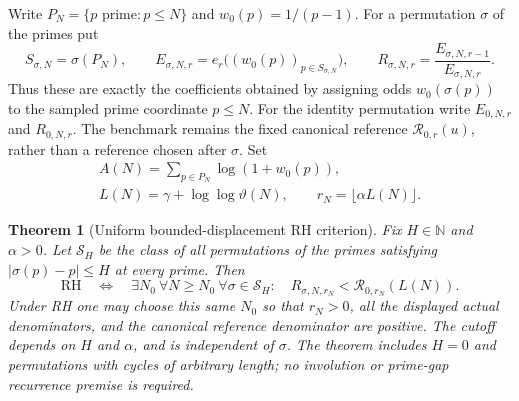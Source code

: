 \documentclass[11pt]{article}
\newtheorem{theorem}{Theorem}[section]
\theoremstyle{definition}
\begin{document}
Write $P_N=\{p\text{ prime}:p\le N\}$ and $w_0(p)=1/(p-1)$.
For a permutation $\sigma$ of the primes put
\[
 S_{\sigma,N}=\sigma(P_N),\qquad
 E_{\sigma,N,r}=e_r\bigl((w_0(p))_{p\in S_{\sigma,N}}\bigr),\qquad
 R_{\sigma,N,r}=\frac{E_{\sigma,N,r-1}}{E_{\sigma,N,r}}.
\]
Thus these are exactly the coefficients obtained by assigning odds
$w_0(\sigma(p))$ to the sampled prime coordinate $p\le N$.
For the identity permutation write $E_{0,N,r}$ and $R_{0,N,r}$.
The benchmark remains the fixed canonical reference
$\mathcal R_{0,r}(u)$, rather than a reference chosen after $\sigma$.
Set
\[
 \begin{gathered}
 A(N)=\sum_{p\in P_N}\log(1+w_0(p)),\\
 L(N)=\gamma+\log\log\vartheta(N),\qquad
 r_N=\lfloor\alpha L(N)\rfloor .
 \end{gathered}
\]

\begin{theorem}[Uniform bounded-displacement RH criterion]
Fix $H\in\mathbb N$ and $\alpha>0$. Let $\mathcal S_H$ be the
class of all permutations of the primes satisfying
$|\sigma(p)-p|\le H$ at every prime. Then
\[
 \mathrm{RH}\quad\Longleftrightarrow\quad
 \exists N_0\ \forall N\ge N_0\ \forall\sigma\in\mathcal S_H:
 \quad R_{\sigma,N,r_N}<\mathcal R_{0,r_N}(L(N)).
\]
Under RH one may choose this same $N_0$ so that $r_N>0$,
all the displayed actual denominators, and the canonical reference
denominator are positive. The cutoff depends on $H$ and $\alpha$,
and is independent of $\sigma$. The theorem includes $H=0$ and
permutations with cycles of arbitrary length; no involution or prime-gap
recurrence premise is required.
\end{theorem}
\end{document}
